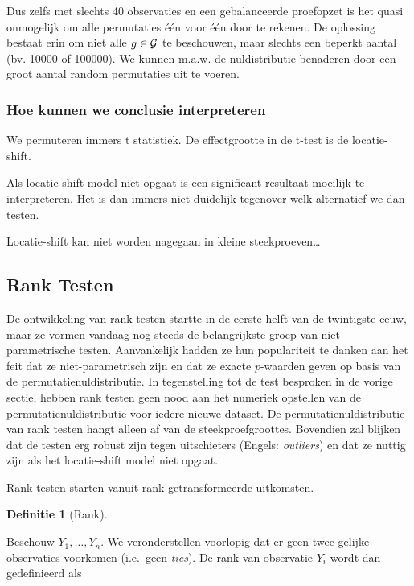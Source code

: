 \documentclass[
  12pt,dutch,coursenotes]{book}
\theoremstyle{definition}
\newtheorem{definition}{Definitie}[chapter]
\theoremstyle{definition}
\theoremstyle{definition}
\theoremstyle{definition}
\theoremstyle{remark}
\begin{document}
Dus zelfs met slechts 40 observaties en een gebalanceerde proefopzet is het quasi onmogelijk om alle permutaties één voor één door te rekenen.
De oplossing bestaat erin om niet alle \(g \in {\cal{G}}\) te beschouwen, maar slechts een beperkt aantal (bv. 10000 of 100000).
We kunnen m.a.w. de nuldistributie benaderen door een groot aantal random permutaties uit te voeren.

\hypertarget{hoe-kunnen-we-conclusie-interpreteren}{%
\subsubsection{Hoe kunnen we conclusie interpreteren}\label{hoe-kunnen-we-conclusie-interpreteren}}

We permuteren immers t statistiek. De effectgrootte in de t-test is de locatie-shift.

Als locatie-shift model niet opgaat is een significant resultaat moeilijk te interpreteren. Het is dan immers niet duidelijk tegenover welk alternatief we dan testen.

Locatie-shift kan niet worden nagegaan in kleine steekproeven\ldots{}

\hypertarget{rank-testen}{%
\subsection{Rank Testen}\label{rank-testen}}

De ontwikkeling van rank testen startte in de eerste helft van de twintigste eeuw, maar ze vormen vandaag nog steeds de belangrijkste groep van niet-parametrische testen. Aanvankelijk hadden ze hun populariteit te danken aan het feit dat ze niet-parametrisch zijn en dat ze exacte \(p\)-waarden geven op basis van de permutatienuldistributie. In tegenstelling tot de test besproken in de vorige sectie, hebben rank testen geen nood aan het numeriek opstellen van de permutatienuldistributie voor iedere nieuwe dataset. De permutatienuldistributie van rank testen hangt alleen af van de steekproefgroottes. Bovendien zal blijken dat de testen erg robust zijn tegen uitschieters (Engels: \emph{outliers}) en dat ze nuttig zijn als het locatie-shift model niet opgaat.

Rank testen starten vanuit rank-getransformeerde uitkomsten.

\begin{definition}[Rank]
\protect\hypertarget{def:unnamed-chunk-207}{}{\label{def:unnamed-chunk-207} {} }
\end{definition}
Beschouw \(Y_1, \ldots, Y_n\). We veronderstellen voorlopig dat
er geen twee gelijke observaties voorkomen (i.e.~geen \emph{ties}).
De rank van observatie \(Y_i\) wordt dan
gedefinieerd als
\end{document}
